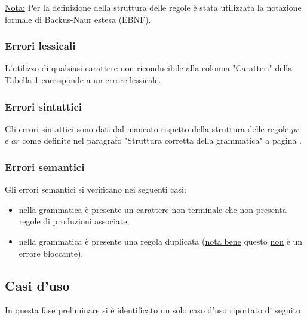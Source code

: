 \documentclass[12pt]{article}
\begin{document}
\underline{Nota:} Per la definizione della struttura delle regole è stata utilizzata la notazione formale di Backus-Naur estesa (EBNF).

\subsubsection{Errori lessicali}
L'utilizzo di qualsiasi carattere non riconducibile alla colonna "Caratteri" della Tabella 1 corrisponde a un errore lessicale.

\subsubsection{Errori sintattici}
Gli errori sintattici sono dati dal mancato rispetto della struttura delle regole $pr$ e $ar$ come definite nel paragrafo "Struttura corretta della grammatica" a pagina \pageref{struttura}.

\subsubsection{Errori semantici}
Gli errori semantici si verificano nei seguenti casi:
\begin{itemize}
\item nella grammatica è presente un carattere non terminale che non presenta regole di produzioni associate;
\item nella grammatica è presente una regola duplicata (\underline{nota bene} questo \underline{non} è un errore bloccante).
\end{itemize}
\pagebreak

\subsection{Casi d'uso}
In questa fase preliminare si è identificato un solo caso d'uso riportato di seguito
\end{document}

